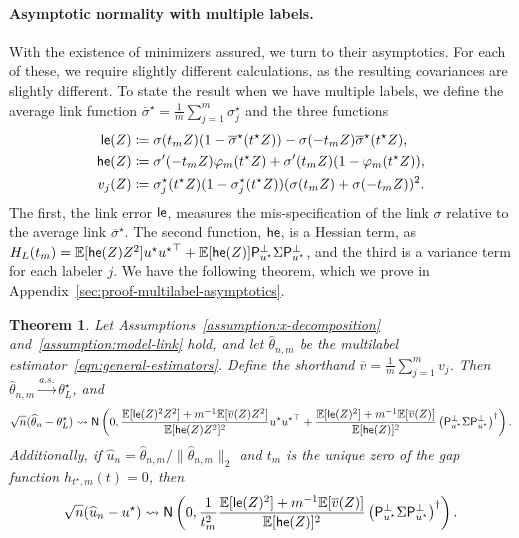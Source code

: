 \documentclass[11pt]{article}
\newcommand{\E}{\mathbb{E}}
\newcommand{\prn}[1]{\left({#1}\right)} %
\newcommand{\what}[1]{\widehat{#1}}
\newcommand{\wb}[1]{\overline{#1}}
\newcommand{\normal}{\mathsf{N}}
\newcommand{\proj}{\mathsf{P}}
\newcommand{\projperp}{\proj_{u\opt}^\perp}
\newcommand{\norms}[1]{\|{#1}\|} %
\newcommand{\ltwos}[1]{\norms{#1}_2} %
\newcommand{\<}{\langle} %
\renewcommand{\>}{\rangle}
\newcommand{\cd}{\rightsquigarrow}
\newcommand{\cas}{\stackrel{a.s.}{\rightarrow}}
\newcommand{\defeq}{\coloneqq}
\newcommand{\opt}{^\star}
\newcommand{\gme}{\what{\theta}_{n,m}} %
\newtheorem{theorem}{Theorem}
\begin{document}
\paragraph{Asymptotic normality with multiple labels.} With the existence of minimizers assured, we turn to their asymptotics.
For each of these, we require slightly different calculations, as the
resulting covariances are slightly different.
To state the result when we have multiple labels,
we define the average link function $\wb{\sigma}\opt = \frac{1}{m} \sum_{j=1}^m \sigma_j\opt$ and the three functions
\begin{align}
	\linkerr(Z) & \defeq \sigma(t_m Z) (1 - \wb{\sigma}\opt(t\opt Z))
	- \sigma(-t_m Z) \wb{\sigma}\opt(t\opt Z), \nonumber \\
	\hessfunc(Z) & \defeq \sigma'(-t_m Z) \varphi_m(t\opt Z)
	+ \sigma'(t_m Z) (1 - \varphi_m(t\opt Z)),
	\label{eqn:error-functions}
	\\
	v_j(Z) & \defeq
	\sigma_j\opt(t\opt Z)(1 - \sigma_j\opt(t\opt Z))
	(\sigma(t_m Z) + \sigma(-t_m Z))^2.
	\nonumber
\end{align}
The first, the link error $\mathsf{le}$, measures the mis-specification of the
link $\sigma$ relative to the average link $\wb{\sigma}\opt$. The second
function, $\mathsf{he}$, is a Hessian term, as $\Hessian(t_m) =
\E[\hessfunc(Z) Z^2]u\opt{u\opt}^\top + \E[\hessfunc(Z)] \projperp \Sigma
\projperp$, and the third is a variance term for each labeler $j$.
We have the following theorem, which we prove
in Appendix~\ref{sec:proof-multilabel-asymptotics}.
\begin{theorem}
  \label{theorem:multilabel-asymptotics}
  Let Assumptions~\ref{assumption:x-decomposition}
  and~\ref{assumption:model-link} hold, and let $\gme$ be the multilabel
  estimator~\eqref{eqn:general-estimators}. Define the shorthand $\wb{v} =
  \frac{1}{m} \sum_{j = 1}^m v_j$. Then $\gme \cas \theta_L\opt$,
  and
  \begin{equation*}
    \sqrt{n} (\what{\theta}_n - \theta_L\opt)
    \cd \normal\left(0,
    \frac{\E[\linkerr(Z)^2 Z^2] + m^{-1} \E[\wb{v}(Z) Z^2]}{
      \E[\hessfunc(Z) Z^2]^2} u\opt {u\opt}^\top
    + \frac{\E[\linkerr(Z)^2] + m^{-1}\E[\wb{v}(Z)]}{\E[\hessfunc(Z)]^2}
    \prn{\projperp \Sigma \projperp}^\dagger
    \right).
  \end{equation*}
  Additionally, if $\what{u}_n = \gme / \ltwos{\gme}$
  and $t_m$ is the unique zero of the gap function $h_{t\opt, m}(t) = 0$, then
  \begin{equation*}
    \sqrt{n}(\what{u}_n - u\opt)
    \cd
    \normal\left(0, \frac{1}{t_m^2}
    \frac{\E[\linkerr(Z)^2] + m^{-1}
      \E[\wb{v}(Z)]}{\E[\hessfunc(Z)]^2}
    \left(\projperp \Sigma \projperp\right)^\dagger\right).
  \end{equation*}
\end{theorem}
\end{document}
